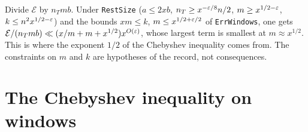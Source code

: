 \begin{remark}
Divide $\mathcal E$ by $n_Tmb$. Under \texttt{RestSize}
($a\le2xb$, $n_T\ge x^{-\varepsilon/8}n/2$, $m\ge x^{1/2-\varepsilon}$, $k\le n^2x^{1/2-\varepsilon}$)
and the bounds $xm\le k$, $m\le x^{1/2+\varepsilon/2}$ of \texttt{ErrWindows}, one
gets $\mathcal E/(n_Tmb)\ll(x/m+m+x^{1/2})x^{O(\varepsilon)}$, whose largest term is
smallest at $m\approx x^{1/2}$. This is where the exponent $1/2$ of the
Chebyshev inequality comes from. The constraints on $m$ and $k$ are hypotheses
of the record, not consequences.
\end{remark}

\section{The Chebyshev inequality on windows}


